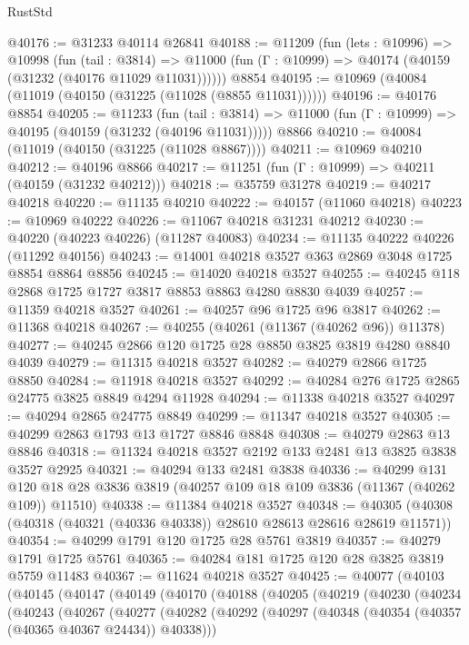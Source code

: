 \begin{lexlean}{RustStd}
\begin{coremodule}
@40176 := @31233 @40114 @26841
@40188 := @11209
    (fun (lets : @10996) =>
    @10998
      (fun (tail : @3814) =>
      @11000 (fun (Γ : @10999) => @40174 (@40159 (@31232 (@40176 @11029 @11031))))))
    @8854
@40195 := @10969 (@40084 (@11019 (@40150 (@31225 (@11028 (@8855 @11031))))))
@40196 := @40176 @8854
@40205 := @11233
    (fun (tail : @3814) => @11000 (fun (Γ : @10999) => @40195 (@40159 (@31232 (@40196 @11031)))))
    @8866
@40210 := @40084 (@11019 (@40150 (@31225 (@11028 @8867))))
@40211 := @10969 @40210
@40212 := @40196 @8866
@40217 := @11251 (fun (Γ : @10999) => @40211 (@40159 (@31232 @40212)))
@40218 := @35759 @31278
@40219 := @40217 @40218
@40220 := @11135 @40210
@40222 := @40157 (@11060 @40218)
@40223 := @10969 @40222
@40226 := @11067 @40218 @31231 @40212
@40230 := @40220 (@40223 @40226) (@11287 @40083)
@40234 := @11135 @40222 @40226 (@11292 @40156)
@40243 := @14001 @40218 @3527 @363 @2869 @3048 @1725 @8854 @8864 @8856
@40245 := @14020 @40218 @3527
@40255 := @40245 @118 @2868 @1725 @1727 @3817 @8853 @8863 @4280 @8830 @4039
@40257 := @11359 @40218 @3527
@40261 := @40257 @96 @1725 @96 @3817
@40262 := @11368 @40218
@40267 := @40255 (@40261 (@11367 (@40262 @96)) @11378)
@40277 := @40245 @2866 @120 @1725 @28 @8850 @3825 @3819 @4280 @8840 @4039
@40279 := @11315 @40218 @3527
@40282 := @40279 @2866 @1725 @8850
@40284 := @11918 @40218 @3527
@40292 := @40284 @276 @1725 @2865 @24775 @3825 @8849 @4294 @11928
@40294 := @11338 @40218 @3527
@40297 := @40294 @2865 @24775 @8849
@40299 := @11347 @40218 @3527
@40305 := @40299 @2863 @1793 @13 @1727 @8846 @8848
@40308 := @40279 @2863 @13 @8846
@40318 := @11324 @40218 @3527 @2192 @133 @2481 @13 @3825 @3838 @3527 @2925
@40321 := @40294 @133 @2481 @3838
@40336 := @40299
    @131
    @120
    @18
    @28
    @3836
    @3819
    (@40257 @109 @18 @109 @3836 (@11367 (@40262 @109)) @11510)
@40338 := @11384 @40218 @3527
@40348 := @40305 (@40308 (@40318 (@40321 (@40336 @40338)) @28610 @28613 @28616 @28619 @11571))
@40354 := @40299 @1791 @120 @1725 @28 @5761 @3819
@40357 := @40279 @1791 @1725 @5761
@40365 := @40284 @181 @1725 @120 @28 @3825 @3819 @5759 @11483
@40367 := @11624 @40218 @3527
@40425 := @40077
    (@40103
      (@40145
        (@40147
          (@40149
            (@40170
              (@40188
                (@40205
                  (@40219
                    (@40230
                      (@40234
                        (@40243
                          (@40267
                            (@40277
                              (@40282
                                (@40292
                                  (@40297 (@40348 (@40354 (@40357 (@40365 @40367 @24434)) @40338)))

\end{coremodule}
\end{lexlean}
